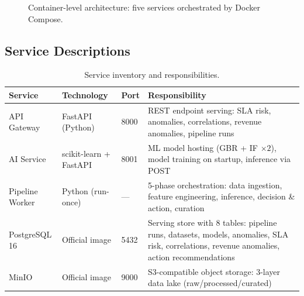 \begin{figure}[H]
\caption{Container-level architecture: five services orchestrated by Docker Compose.}
\label{fig:container-arch}
\end{figure}

\subsection{Service Descriptions}

\begin{table}[H]
\centering
\caption{Service inventory and responsibilities.}
\label{tab:services}
\begin{tabularx}{\textwidth}{@{}lllX@{}}
\toprule
\textbf{Service} & \textbf{Technology} & \textbf{Port} & \textbf{Responsibility} \\
\midrule
API Gateway  & FastAPI (Python)   & 8000 & REST endpoint serving: SLA risk, anomalies, correlations, revenue anomalies, pipeline runs \\
AI Service   & scikit-learn + FastAPI & 8001 & ML model hosting (GBR + IF $\times 2$), model training on startup, inference via POST \\
Pipeline Worker & Python (run-once) & --- & 5-phase orchestration: data ingestion, feature engineering, inference, decision \& action, curation \\
PostgreSQL 16 & Official image    & 5432 & Serving store with 8 tables: pipeline runs, datasets, models, anomalies, SLA risk, correlations, revenue anomalies, action recommendations \\
MinIO        & Official image     & 9000 & S3-compatible object storage: 3-layer data lake (raw/processed/curated) \\
\bottomrule
\end{tabularx}
\end{table}

